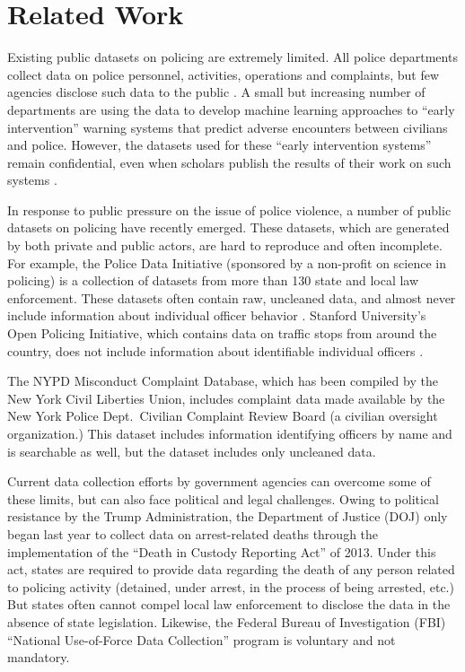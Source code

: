 \section{Related Work}\label{sec:related}

Existing public datasets on policing are extremely limited. All police
departments collect data on police personnel, activities, operations and
complaints, but few agencies disclose such data to the public \cite{Jackman21}.
A small but increasing number of departments are using the data to develop
machine learning approaches to “early intervention” warning systems that
predict adverse encounters between civilians and police. However, the datasets
used for these “early intervention systems” remain confidential, even when
scholars publish the results of their work on such systems \cite{Helsby18}.

In response to public pressure on the issue of police violence, a number of
public datasets on policing have recently emerged. These datasets, which are
generated by both private and public actors, are hard to reproduce and often
incomplete. For example, the Police Data Initiative (sponsored by a non-profit
on science in policing) is a collection of datasets from more than 130 state
and local law enforcement. These datasets often contain raw, uncleaned data,
and almost never include information about individual officer behavior
\cite{pdi}.  Stanford University’s Open Policing Initiative, which contains
data on traffic stops from around the country, does not include information
about identifiable individual officers \cite{sopp}.

The NYPD Misconduct Complaint Database, which has been compiled by the New York
Civil Liberties Union, includes complaint data made available by the New York
Police Dept.\ Civilian Complaint Review Board (a civilian oversight
organization.) This dataset includes information identifying officers by name
and is searchable as well, but the dataset includes only uncleaned data.
 
Current data collection efforts by government agencies can overcome some of
these limits, but can also face political and legal challenges. Owing to
political resistance by the Trump Administration, the Department of Justice
(DOJ) only began last year to collect data on arrest-related deaths through the
implementation of the ``Death in Custody Reporting Act'' of 2013. Under this
act, states are required to provide data regarding the death of any person
related to policing activity (detained, under arrest, in the process of being
arrested, etc.) But states often cannot compel local law enforcement to
disclose the data in the absence of state legislation. Likewise, the Federal
Bureau of Investigation (FBI) ``National Use-of-Force Data Collection'' program
is voluntary and not mandatory.


